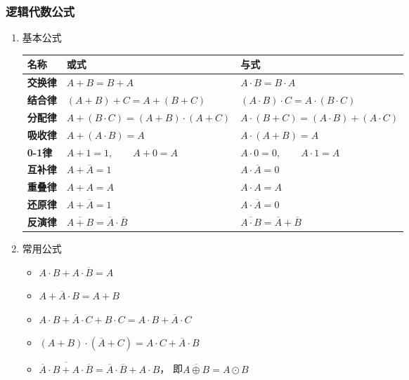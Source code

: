 \documentclass[UTF8,fontset=fandol,zihao=5]{ctexart}
\begin{document}
\subsubsection{逻辑代数公式}

\begin{enumerate}

\item 基本公式

  \begin{center}
    \begin{tabularx}{0.92\textwidth}{>{\bfseries}p{2.5cm}X X}
      \toprule
      名称 & 或式 & 与式 \\
      \midrule
      交换律 & $A + B = B + A$ & $A \cdot B = B \cdot A$ \\
      结合律 & $(A + B) + C = A + (B + C)$ & $(A \cdot B) \cdot C = A \cdot (B \cdot C)$ \\
      分配律 & $A + (B \cdot C) = (A + B) \cdot (A + C)$ & $A \cdot (B + C) = (A \cdot B) + (A \cdot C)$ \\
      吸收律 & $A + (A \cdot B) = A$ & $A \cdot (A + B) = A$ \\
      0-1律 & $A + 1 = 1, \qquad A + 0 = A$ & $A \cdot 0 = 0, \qquad A \cdot 1 = A$ \\
      互补律 & $A + \overline{A} = 1$ & $A \cdot \overline{A} = 0$ \\
      重叠律 & $A + A = A$ & $A \cdot A = A$ \\
      还原律 & $A + \overline{A} = 1$ & $A \cdot \overline{A} = 0$ \\
      反演律 & $\overline{A + B} = \overline{A} \cdot \overline{B}$ & $\overline{A \cdot B} = \overline{A} + \overline{B}$ \\
      \bottomrule
    \end{tabularx}
  \end{center}

  \item 常用公式

    \begin{itemize}
      \item $A \cdot B + A \cdot \overline{B} = A$
      \item $A + \overline{A} \cdot B = A + B$
      \item $A \cdot B + \overline{A} \cdot C + B \cdot C = A \cdot B + \overline{A} \cdot C$ 
      \item $ \left ( A + B \right ) \cdot \left (\overline{A} + C \right ) = A \cdot C + \overline{A} \cdot B$
      \item $ \overline{\overline{A} \cdot B + A \cdot \overline{B}} = \overline{A} \cdot \overline{B} + A \cdot B$，
      即$\overline{A \oplus B} = A \odot B$\\
    \end{itemize}

\end{enumerate}
\end{document}
